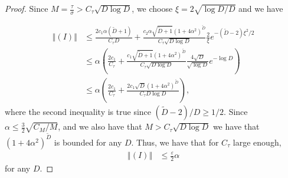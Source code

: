 \documentclass[12pt]{article}
\theoremstyle{remark}
\newcommand{\eps}{\varepsilon}
\newcommand{\norm}[1]{\left\Vert #1 \right\Vert}
\newcommand{\wtilde}[1]{\widetilde{#1}}
\begin{document}
\begin{appendices}
\begin{proof}
Since $M = \frac{\tau}{\sigma}>C_\tau\sqrt{D \log D}$, we choose $\xi = 2\sqrt{\log D/D}$ and we have

\begin{align*}
    \norm{(I)} 
&\leq \frac{2c_1 \alpha(\wtilde D+1)}{C_\tau D} + \frac{c_2 \alpha \sqrt{\wtilde D+1}( 1 + 4\alpha^2)^{\wtilde D} }
{C_\tau\sqrt{D \log D}}\frac{2}{\xi}e^{-(\wtilde D - 2 )\xi^2/2}
\\
&\leq \alpha\left(\frac{2c_1 }{C_\tau} + \frac{c_1 \sqrt{\wtilde D+1}( 1 + 4\alpha^2)^{\wtilde D} } 
{C_\tau\sqrt{D\log D }}\frac{4\sqrt{D}}{\sqrt{\log D}}e^{-\log D}\right)
\\
&\leq \alpha\left(\frac{2c_1 }{C_\tau} + \frac{2c_1 \sqrt{D}( 1 + 4\alpha^2)^{\wtilde D} }
{C_\tau D\log D }\right)
,\end{align*}
where the second inequality is true since  $(\wtilde D-2)/D \geq 1/2$.
Since $\alpha \leq \frac{3}{2} \sqrt{C_M/M} $, and we also have that $M>C_\tau\sqrt{D \log D}$ we have that 
$( 1 + 4\alpha^2)^{\wtilde D}$ is bounded for any $D$. Thus, we have that for $C_\tau$ large enough, 
\begin{align}
\norm{(I)} 
&\leq \frac{\eps}{2}\alpha
\end{align}
for any $D$.



\end{proof}
\end{appendices}
\end{document}
